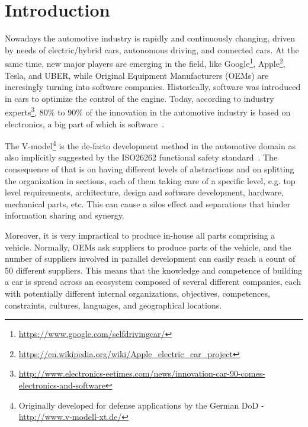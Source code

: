 \section{Introduction}\label{sec:intro}


Nowadays the automotive industry is rapidly and continuously changing, driven by needs of 
electric/hybrid cars, autonomous driving, and connected cars. At the same time, new major players are emerging in the field, like Google\footnote{\url{https://www.google.com/selfdrivingcar/}},  %
Apple\footnote{\url{https://en.wikipedia.org/wiki/Apple_electric_car_project}}, %
 Tesla, and UBER, while Original Equipment Manufacturers (OEMs) are incresingly turning into software companies. 
Historically, software was introduced in cars to optimize the control of the engine. 
Today, according to industry experts\footnote{\url{http://www.electronics-eetimes.com/news/innovation-car-90-comes-electronics-and-software}}, 80\% to 90\% of the innovation in the automotive industry is based on electronics, a big part of which is software~\cite{ESEM2016}. 

The V-model\footnote{Originally developed for defense applications by the German DoD - \url{http://www.v-modell-xt.de/}} is the de-facto development method in the automotive domain as also implicitly suggested by the ISO26262 functional safety standard~\cite{iso26262}. The consequence of that is on having 
different levels of abstractions and on splitting the organization in sections, each of them taking care of a specific level, e.g. top level requirements,
architecture, design and software development, hardware, mechanical parts, etc. 
This can cause a silos effect and separations that hinder information sharing and synergy.

Moreover, it is very impractical to produce in-house all parts comprising a vehicle. Normally, OEMs 
ask suppliers to produce parts of the vehicle, and the number of suppliers involved in parallel development can easily reach a count of 50 different suppliers. 
This means that the knowledge and competence of building a car is spread across an ecosystem composed of several different companies, each with potentially different internal organizations, objectives, competences, constraints, cultures, languages, and geographical locations. 

